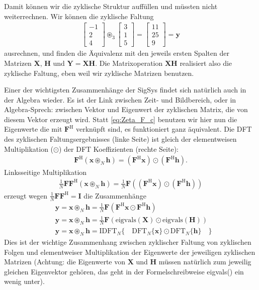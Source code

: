 Damit können wir die zyklische Struktur auffüllen und müssten nicht
weiterrechnen.
%
Wir können die zyklische Faltung
\begin{align}
\begin{bmatrix}
-1\\2\\4
\end{bmatrix}
\circledast_3
\begin{bmatrix}
3\\1\\5
\end{bmatrix}
=
\begin{bmatrix}
11\\25\\9
\end{bmatrix}
= \bm{y}
\end{align}
ausrechnen, und finden die Äquivalenz mit den jeweils ersten Spalten der Matrizen
$\bm{X}$, $\bm{H}$ und $\bm{Y} = \bm{X} \bm{H}$.
Die Matrixoperation $\bm{X} \bm{H}$
realisiert also die zyklische Faltung,
eben weil wir zyklische Matrizen benutzen.

Einer der wichtigsten Zusammenhänge der SigSys findet sich natürlich auch
in der Algebra wieder. Es ist der Link zwischen Zeit- und Bildbereich, oder
in Algebra-Sprech: zwischen Vektor und Eigenwert der zyklischen Matrix, die von diesem
Vektor erzeugt wird. Statt \eqref{eq:Zeta_F_c} benutzen wir hier nun die Eigenwerte
die mit $\bm{F}^\mathrm{H}$ verknüpft sind, es funktioniert ganz äquivalent.
%
Die DFT des zyklischen Faltungsergebnisses (linke Seite)
ist gleich der elementweisen Multiplikation ($\odot$) der DFT Koeffizienten (rechte Seite):
\begin{align}
\bm{F}^\mathrm{H}(\bm{x} \circledast_N \bm{h}) = (\bm{F}^\mathrm{H}\bm{x})  \odot (\bm{F}^\mathrm{H}\bm{h}).
\end{align}
Linksseitige Multiplikation
\begin{align}
\frac{1}{N} \bm{F}\bm{F}^\mathrm{H}(\bm{x} \circledast_N \bm{h}) =
\frac{1}{N} \bm{F}\left( (\bm{F}^\mathrm{H}\bm{x})  \odot (\bm{F}^\mathrm{H}\bm{h}) \right)
\end{align}
erzeugt wegen $\frac{1}{N} \bm{F}\bm{F}^\mathrm{H} = \bm{I}$ die Zusammenhänge
\begin{align}
&\bm{y} = \bm{x} \circledast_N \bm{h} =
\frac{1}{N} \bm{F} \left( \bm{F}^\mathrm{H}\bm{x}  \odot \bm{F}^\mathrm{H}\bm{h} \right)\\
&\bm{y} = \bm{x} \circledast_N \bm{h} =
\frac{1}{N} \bm{F}\left( \mathrm{eigvals}(\bm{X})  \odot \mathrm{eigvals}(\bm{H}) \right)\\
&\bm{y} = \bm{x} \circledast_N \bm{h} = \mathrm{IDFT}_N\{\quad  \mathrm{DFT}_N\{\bm{x}\} \odot  \mathrm{DFT}_N\{\bm{h}\} \quad \}
\end{align}
Dies ist der wichtige Zusammenhang zwischen zyklischer Faltung von zyklischen Folgen und
elementweiser Multiplikation der Eigenwerte der jeweiligen zyklischen Matrizen
(Achtung: die Eigenwerte von $\bm{X}$ und $\bm{H}$ müssen natürlich zum jeweilig gleichen
Eigenvektor gehören, das geht in der Formelschreibweise eigvals() ein wenig unter).
%

